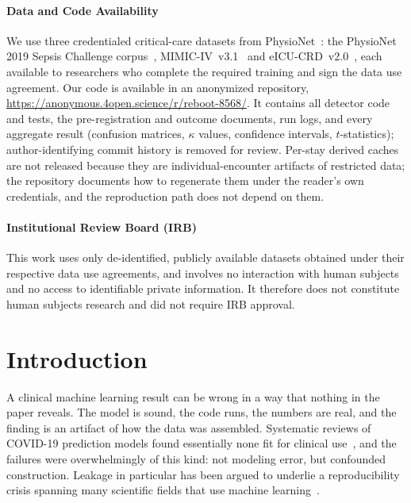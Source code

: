 \documentclass[pmlr,twocolumn,10pt]{jmlr}
\begin{document}
\paragraph*{Data and Code Availability}
We use three credentialed critical-care datasets from
PhysioNet~\citep{goldberger2000physiobank}: the PhysioNet 2019 Sepsis Challenge
corpus~\citep{reyna2020early}, MIMIC-IV~v3.1~\citep{johnson2023mimiciv} and
eICU-CRD~v2.0~\citep{pollard2018eicu}, each available to researchers who
complete the required training and sign the data use agreement. Our code is
available in an anonymized repository, \url{https://anonymous.4open.science/r/reboot-8568/}. It
contains all detector code and tests, the pre-registration and outcome
documents, run logs, and every aggregate result (confusion matrices, $\kappa$
values, confidence intervals, $t$-statistics); author-identifying commit history
is removed for review. Per-stay derived caches are not released because they are
individual-encounter artifacts of restricted data; the repository documents how
to regenerate them under the reader's own credentials, and the reproduction path
does not depend on them.

\paragraph*{Institutional Review Board (IRB)}
This work uses only de-identified, publicly available datasets obtained under
their respective data use agreements, and involves no interaction with human
subjects and no access to identifiable private information. It therefore does
not constitute human subjects research and did not require IRB approval.
\fi

\section{Introduction}
\label{sec:intro}

A clinical machine learning result can be wrong in a way that nothing in the
paper reveals. The model is sound, the code runs, the numbers are real, and the
finding is an artifact of how the data was assembled. Systematic reviews of
COVID-19 prediction models found essentially none fit for clinical
use~\citep{wynants2020prediction,roberts2021common}, and the failures were
overwhelmingly of this kind: not modeling error, but confounded construction.
Leakage in particular has been argued to underlie a reproducibility crisis
spanning many scientific fields that use machine
learning~\citep{kapoor2023leakage}.
\end{document}
